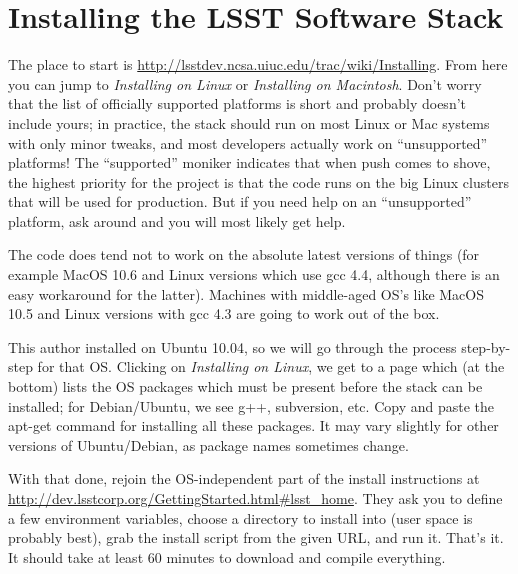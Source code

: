 \documentclass{book}
\begin{document}
%
% 
%

\appendix

\chapter{Installing the LSST Software
  Stack\label{appendix-stackinstall}}


The place to start is
\url{http://lsstdev.ncsa.uiuc.edu/trac/wiki/Installing}.  From here
you can jump to {\it Installing on Linux} or {\it Installing on
  Macintosh}.  Don't worry that the list of officially supported
platforms is short and probably doesn't include yours; in practice,
the stack should run on most Linux or Mac systems with only minor
tweaks, and most developers actually work on ``unsupported''
platforms!  The ``supported'' moniker indicates that when push comes
to shove, the highest priority for the project is that the code runs
on the big Linux clusters that will be used for production.  But if
you need help on an ``unsupported'' platform, ask around and you will
most likely get help.

The code does tend not to work on the absolute latest versions of
things (for example MacOS 10.6 and Linux versions which use gcc 4.4,
although there is an easy workaround for the latter).  Machines with
middle-aged OS's like MacOS 10.5 and Linux versions with gcc 4.3 are
going to work out of the box.

This author installed on Ubuntu 10.04, so we will go through the
process step-by-step for that OS.  Clicking on {\it Installing on
  Linux}, we get to a page which (at the bottom) lists the OS packages
which must be present before the stack can be installed; for
Debian/Ubuntu, we see g++, subversion, etc.  Copy and paste the
apt-get command for installing all these packages. It may vary
slightly for other versions of Ubuntu/Debian, as package names
sometimes change.

With that done, rejoin the OS-independent part of the install
instructions at
\url{http://dev.lsstcorp.org/GettingStarted.html#lsst_home}.  They ask
you to define a few environment variables, choose a directory to
install into (user space is probably best), grab the install script
from the given URL, and run it.  That's it.  It should take at least
60 minutes to download and compile everything. 
\end{document}
